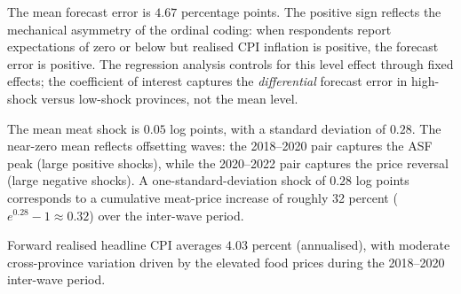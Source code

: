 The mean forecast error is $4.67$ percentage points.
The positive sign reflects the mechanical asymmetry of the
ordinal coding: when respondents report expectations of zero
or below but realised CPI inflation is positive, the forecast
error is positive.
The regression analysis controls for this level effect through
fixed effects; the coefficient of interest captures the
\textit{differential} forecast error in high-shock versus
low-shock provinces, not the mean level.

The mean meat shock is $0.05$ log points, with a standard
deviation of $0.28$.
The near-zero mean reflects offsetting waves: the 2018--2020
pair captures the ASF peak (large positive shocks), while the
2020--2022 pair captures the price reversal (large negative
shocks).
A one-standard-deviation shock of $0.28$ log points
corresponds to a cumulative meat-price increase of roughly
32 percent ($e^{0.28} - 1 \approx 0.32$) over the inter-wave
period.

Forward realised headline CPI averages $4.03$ percent
(annualised), with moderate cross-province variation driven
by the elevated food prices during the 2018--2020 inter-wave
period.
